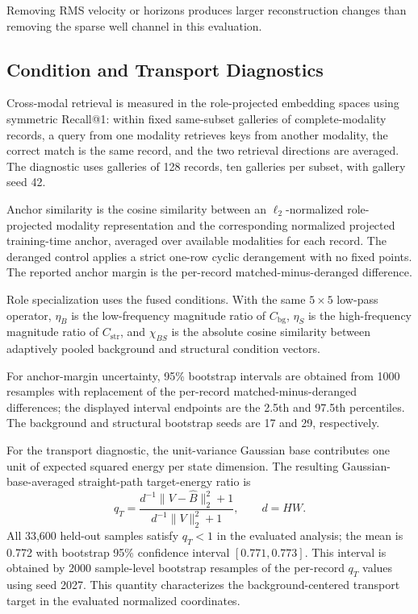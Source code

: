Removing RMS velocity or horizons produces larger reconstruction changes than removing the sparse well channel in this evaluation.

\subsection{Condition and Transport Diagnostics}

Cross-modal retrieval is measured in the role-projected embedding spaces using symmetric Recall@1: within fixed same-subset galleries of complete-modality records, a query from one modality retrieves keys from another modality, the correct match is the same record, and the two retrieval directions are averaged. The diagnostic uses galleries of 128 records, ten galleries per subset, with gallery seed 42.

Anchor similarity is the cosine similarity between an $\ell_2$-normalized role-projected modality representation and the corresponding normalized projected training-time anchor, averaged over available modalities for each record. The deranged control applies a strict one-row cyclic derangement with no fixed points. The reported anchor margin is the per-record matched-minus-deranged difference.

Role specialization uses the fused conditions. With the same $5\times5$ low-pass operator, $\eta_B$ is the low-frequency magnitude ratio of $C_{\mathrm{bg}}$, $\eta_S$ is the high-frequency magnitude ratio of $C_{\mathrm{str}}$, and $\chi_{BS}$ is the absolute cosine similarity between adaptively pooled background and structural condition vectors.

For anchor-margin uncertainty, 95\% bootstrap intervals are obtained from 1000 resamples with replacement of the per-record matched-minus-deranged differences; the displayed interval endpoints are the 2.5th and 97.5th percentiles. The background and structural bootstrap seeds are 17 and 29, respectively.

For the transport diagnostic, the unit-variance Gaussian base contributes one unit of expected squared energy per state dimension. The resulting Gaussian-base-averaged straight-path target-energy ratio is
\begin{equation}
q_T=
\frac{d^{-1}\|V-\hat B\|_2^2+1}
{d^{-1}\|V\|_2^2+1},
\qquad d=HW .
\end{equation}
All 33,600 held-out samples satisfy $q_T<1$ in the evaluated analysis; the mean is 0.772 with bootstrap 95\% confidence interval $[0.771,0.773]$. This interval is obtained by 2000 sample-level bootstrap resamples of the per-record $q_T$ values using seed 2027. This quantity characterizes the background-centered transport target in the evaluated normalized coordinates.

